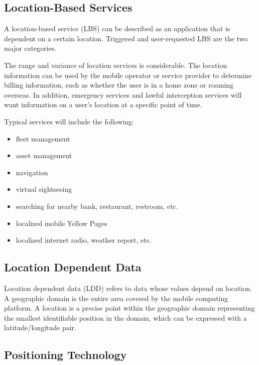 \documentclass[12pt,a4paper]{article}
\begin{document}
\subsection{Location-Based Services} %
\label{sub:location_based_services}
A location-based service (LBS) can be described as an application that is dependent on a certain location. Triggered and user-requested LBS are the two major categories. \cite{DRoza:2003wz}

The range and variance of location services is considerable. The location information can be used by the mobile operator or service provider to determine billing information, such as whether the user is in a home zone or roaming overseas. In addition, emergency services and lawful interception services will want information on a user's location at a specific point of time. \cite{Adams:2003un}

Typical services will include the following:

\begin{itemize}
	\item fleet management
	\item asset management
	\item navigation
	\item virtual sightseeing
	\item searching for nearby bank, restaurant, restroom, etc.
	\item localized mobile Yellow Pages
	\item localized internet radio, weather report, etc.
\end{itemize}

\subsection{Location Dependent Data} %
\label{sub:location_dependent_data}
Location dependent data (LDD) refers to data whose values depend on location. A geographic domain is the entire area covered by the mobile computing platform. A location is a precise point within the geographic domain representing the smallest identifiable position in the domain, which can be expressed with a latitude/longitude pair.\cite{Dunham:1998ci}

\subsection{Positioning Technology} %
\label{sub:positioning_technology}
\end{document}
